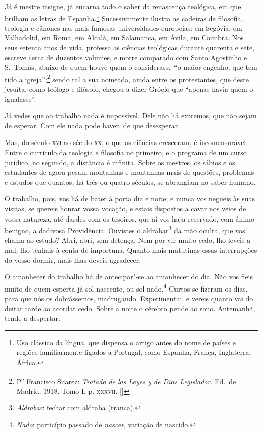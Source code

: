 Já é mestre insigne, já encarna todo o saber da renascença
teológica, em que brilham as letras de Espanha.\footnote{Uso clássico da língua, que dispensa o artigo antes do nome de países e
regiões familiarmente ligados a Portugal, como Espanha, França,
Inglaterra, África.}
Sucessivamente ilustra as cadeiras de filosofia, teologia e
cânones nas mais famosas
universidades europeias: em Segóvia, em Valhadolid, em Roma, em
Alcalá, em Salamanca, em Ávila, em Coimbra. 
Nos seus setenta anos de vida, professa as ciências
teológicas durante quarenta e sete, escreve cerca de duzentos volumes,
e morre comparado com Santo Agostinho e S.~Tomás, abaixo de quem houve quem
o considerasse ``o maior engenho, que tem tido a
igreja'';\footnote{ P\textsuperscript{e} Francisco Suarez: \textit{Tratado
de las Leyes y de Dios Legislador}. Ed.~de Madrid, 1918. Tomo I, p.
\textsc{xxxvii}. []} sendo tal a sua nomeada, ainda entre os protestantes,
que deste jesuíta, como teólogo e filósofo, chegou a dizer
Grócio que ``apenas havia quem o igualasse''.

Já vedes que ao trabalho nada é impossível. Dele não há extremos,
que não sejam de esperar. Com ele nada pode haver, de que desesperar.

Mas, do século \textsc{xvi} ao século \textsc{xx}, o que as ciências cresceram, é
incomensurável. Entre o currículo da teologia e filosofia no primeiro,
e o programa de um curso jurídico, no segundo, a distância é infinita.
Sobre os mestres, os sábios e os estudantes de agora pesam montanhas e
montanhas mais de questões, problemas e estudos que quantos, há três ou
quatro séculos, se abrangiam no saber humano.

O trabalho, pois, vos há de bater à porta dia e noite; e nunca vos
negueis às suas visitas, se quereis honrar vossa vocação, e estais
dispostos a cavar nos veios de vossa natureza, até dardes com os
tesoiros, que aí vos haja reservado, com ânimo benigno, a dadivosa
Providência. Ouvistes o aldrabar\footnote{\textit{Aldrabar}: fechar com aldraba (tranca).} da mão oculta, que vos chama
ao estudo? Abri, abri, sem detença. Nem por vir muito cedo, lho leveis
a mal, lho tenhais à conta de importuna. Quanto mais
matutinas essas interrupções do vosso dormir, mais lhas deveis agradecer.

O amanhecer do trabalho há de antecipar"-se ao amanhecer do dia.
Não vos fieis muito de quem esperta já sol nascente, ou sol
nado.\footnote{\emph{Nado}: particípio passado de \textit{nascer}, variação de
nascido.} Curtos se fizeram os dias, para que nós os
dobrássemos, madrugando. Experimentai, e vereis quanto vai do deitar
tarde ao acordar cedo. Sobre a noite o cérebro pende ao sono.
Antemanhã, tende a despertar.

